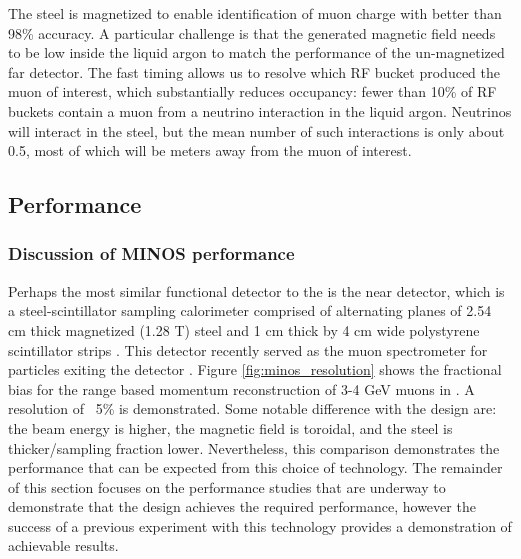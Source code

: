 The steel is magnetized to enable identification of muon charge
with better than 98\% accuracy. A particular challenge is that the generated magnetic field needs to be low inside the liquid argon to match the performance of the un-magnetized far detector. The fast timing allows us to resolve which RF bucket produced the muon of interest, which substantially reduces occupancy: fewer than 10\% of RF buckets contain a muon from a neutrino interaction in the liquid argon. Neutrinos will interact in the  steel, but the mean number of such interactions is only about 0.5, most of which will be meters away from the muon of interest.

\subsection{Performance}
\label{sec:tms-ovvw-perf}
\subsubsection{Discussion of MINOS performance}

Perhaps the most similar functional detector to the  is the  near detector, which is a steel-scintillator sampling calorimeter comprised of alternating planes of 2.54 cm thick magnetized (1.28 T) steel and 1 cm thick by 4 cm wide polystyrene scintillator strips \cite{minosNIM}. This detector recently served as the muon spectrometer for particles exiting the  detector \cite{MINERvA:2006aa}. Figure \ref{fig:minos_resolution} shows the fractional bias for the range based momentum reconstruction of 3-4 GeV muons in  \cite{bhattacharyaMINOS}. A resolution of ~5\% is demonstrated. Some notable difference with the  design are: the beam energy is higher, the magnetic field is toroidal, and the steel is thicker/sampling fraction lower. Nevertheless, this comparison demonstrates the performance that can be expected from this choice of technology. The remainder of this section focuses on the performance studies that are underway to demonstrate that the  design achieves the required performance, however the success of a previous experiment with this technology provides a demonstration of achievable results.   

